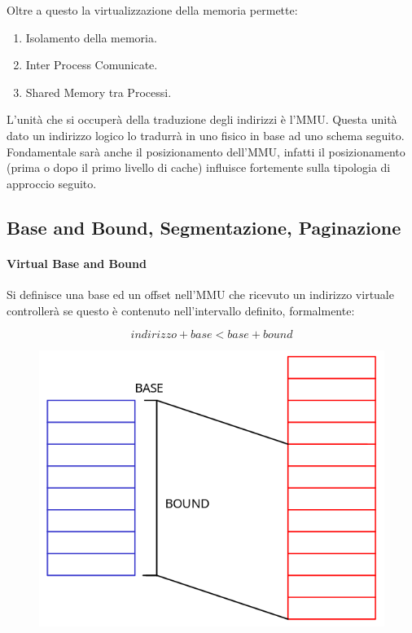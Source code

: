 \documentclass{article}
\begin{document}
Oltre a questo la virtualizzazione della memoria permette:

\begin{enumerate}
    \item Isolamento della memoria.
    \item Inter Process Comunicate.
    \item Shared Memory tra Processi.
\end{enumerate}

L'unità che si occuperà della traduzione degli indirizzi è l'MMU. Questa unità dato un indirizzo logico lo tradurrà in uno fisico in base ad uno schema seguito. Fondamentale sarà anche il posizionamento dell'MMU, infatti il posizionamento (prima o dopo il primo livello di cache) influisce fortemente sulla tipologia di approccio seguito.

\subsection{Base and Bound, Segmentazione, Paginazione}

\paragraph{Virtual Base and Bound} Si definisce una base ed un offset nell'MMU che ricevuto un indirizzo virtuale controllerà se questo è contenuto nell'intervallo definito, formalmente: 

\vspace*{-10px}

\[ indirizzo + base < base + bound \]

\begin{figure}[htbp]
    \center
    \includegraphics[scale=0.3]{img/base_and_bound.png}
\end{figure}
\end{document}
